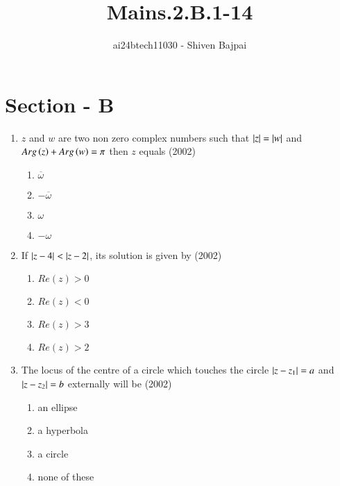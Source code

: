 \documentclass[journal,12pt,twocolumn]{IEEEtran}
\theoremstyle{remark}
\begin{document}

\vspace{3cm}

\title{Mains.2.B.1-14}
\author{ai24btech11030 - Shiven Bajpai}
\maketitle
\newpage
\bigskip

\renewcommand{\thefigure}{\theenumi}
\renewcommand{\thetable}{\theenumi}

\section*{Section - B}

\begin{enumerate}
	\item{$z$ and $w$ are two non zero complex numbers such that $\left\vert z\right\vert = \left\vert w\right\vert$ and $Arg\left(z\right) + Arg\left(w\right) = \pi$ then $z$ equals \hfill (2002)
		\begin{multicols}{4}
		\begin{enumerate}
			\item{$\overline{\omega}$} \columnbreak \item{$-\overline{\omega}$} \columnbreak \item{$\omega$} \columnbreak \item{$-\omega$}
		\end{enumerate}
		\end{multicols}
		}
		
	\item{If $\left\vert z-4\right\vert<\left\vert z-2\right\vert$, its solution is given by \hfill (2002)
		\begin{multicols}{2}
		\begin{enumerate}
			\item{$Re(z)>0$} 
			\item{$Re(z)<0$}
			\columnbreak
			\item{$Re(z)>3$}
			\item{$Re(z)>2$}
		\end{enumerate}
		\end{multicols}}
		
	\item{The locus of the centre of a circle which touches the circle $\left\vert z-z_1\right\vert=a$ and $\left\vert z-z_2\right\vert=b$ externally  will be \hfill (2002)
		\begin{multicols}{2}
		\begin{enumerate}
			\item{an ellipse}
			\item{a hyperbola} 
			\columnbreak
			\item{a circle}
			\item{none of these}
		\end{enumerate}
		\end{multicols}}
		

\end{enumerate}
\end{document}

